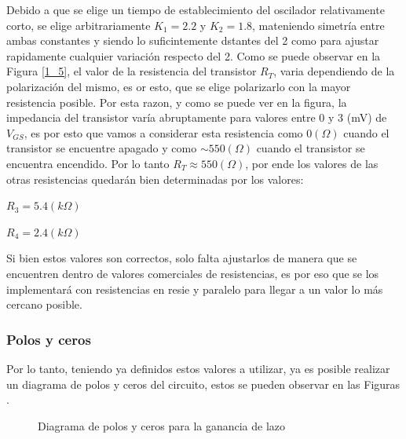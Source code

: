 Debido a que se elige un tiempo de establecimiento del oscilador relativamente
corto, se elige arbitrariamente $K_{1}=2.2$ y $K_{2}=1.8$, mateniendo
simetría entre ambas constantes y siendo lo suficintemente dstantes
del 2 como para ajustar rapidamente cualquier variación respecto del
2. Como se puede observar en la Figura \ref{1_5}, el valor de la
resistencia del transistor $R_{T}$, varia dependiendo de la polarización
del mismo, es or esto, que se elige polarizarlo con la mayor resistencia
posible. Por esta razon, y como se puede ver en la figura, la impedancia
del transistor varía abruptamente para valores entre 0 y 3 (mV) de
$V_{GS}$, es por esto que vamos a considerar esta resistencia como
$0(\Omega)$ cuando el transistor se encuentre apagado y como $\sim550(\Omega)$
cuando el transistor se encuentra encendido. Por lo tanto $R_{T}\approx550(\Omega)$,
por ende los valores de las otras resistencias quedarán bien determinadas
por los valores:

$R_{3}=5.4(k\Omega)$

$R_{4}=2.4(k\Omega)$

Si bien estos valores son correctos, solo falta ajustarlos de manera
que se encuentren dentro de valores comerciales de resistencias, es
por eso que se los implementará con resistencias en resie y paralelo
para llegar a un valor lo más cercano posible.

\subsubsection{Polos y ceros}

Por lo tanto, teniendo ya definidos estos valores a utilizar, ya es
posible realizar un diagrama de polos y ceros del circuito, estos
se pueden observar en las Figuras .
\begin{center}
\begin{figure}[H]
\begin{centering}
\par\end{centering}
\begin{centering}
\caption{Diagrama de polos y ceros para la ganancia de lazo}
\par\end{centering}
\end{figure}
\par\end{center}

